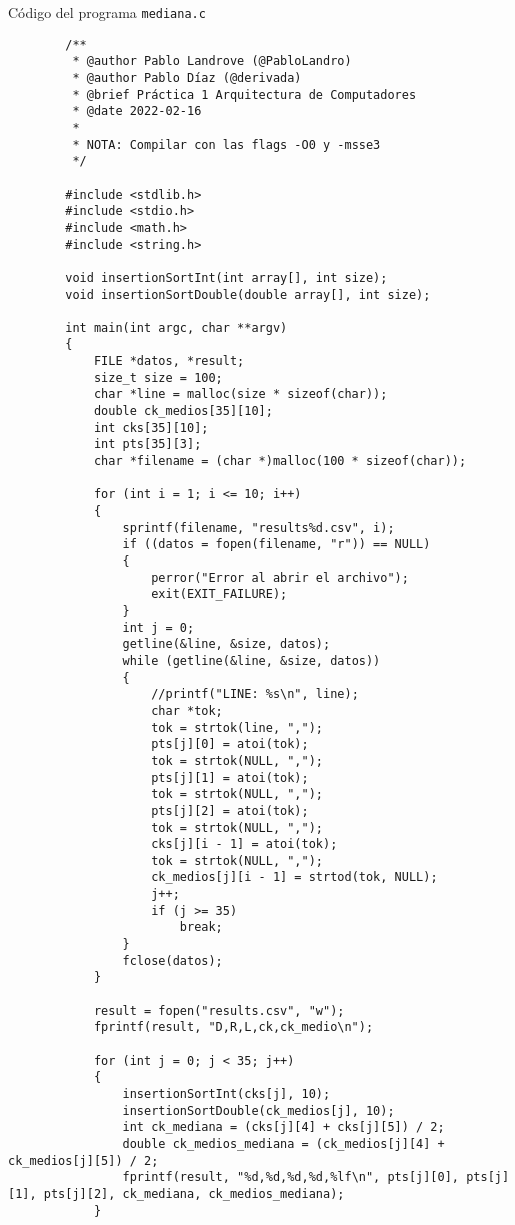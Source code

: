 \documentclass[a4paper,twocolumn]{article}
\begin{document}
        \newpage
        \large{Código del programa \texttt{mediana.c}}
        \begin{lstlisting}
        /**
         * @author Pablo Landrove (@PabloLandro)
         * @author Pablo Díaz (@derivada)
         * @brief Práctica 1 Arquitectura de Computadores
         * @date 2022-02-16
         *
         * NOTA: Compilar con las flags -O0 y -msse3
         */
        
        #include <stdlib.h>
        #include <stdio.h>
        #include <math.h>
        #include <string.h>
        
        void insertionSortInt(int array[], int size);
        void insertionSortDouble(double array[], int size);
        
        int main(int argc, char **argv)
        {
            FILE *datos, *result;
            size_t size = 100;
            char *line = malloc(size * sizeof(char));
            double ck_medios[35][10];
            int cks[35][10];
            int pts[35][3];
            char *filename = (char *)malloc(100 * sizeof(char));
        
            for (int i = 1; i <= 10; i++)
            {
                sprintf(filename, "results%d.csv", i);
                if ((datos = fopen(filename, "r")) == NULL)
                {
                    perror("Error al abrir el archivo");
                    exit(EXIT_FAILURE);
                }
                int j = 0;
                getline(&line, &size, datos);
                while (getline(&line, &size, datos))
                {
                    //printf("LINE: %s\n", line);
                    char *tok;
                    tok = strtok(line, ",");
                    pts[j][0] = atoi(tok);
                    tok = strtok(NULL, ",");
                    pts[j][1] = atoi(tok);
                    tok = strtok(NULL, ",");
                    pts[j][2] = atoi(tok);
                    tok = strtok(NULL, ",");
                    cks[j][i - 1] = atoi(tok);
                    tok = strtok(NULL, ",");
                    ck_medios[j][i - 1] = strtod(tok, NULL);
                    j++;
                    if (j >= 35)
                        break;
                }
                fclose(datos);
            }
        
            result = fopen("results.csv", "w");
            fprintf(result, "D,R,L,ck,ck_medio\n");
        
            for (int j = 0; j < 35; j++)
            {
                insertionSortInt(cks[j], 10);
                insertionSortDouble(ck_medios[j], 10);
                int ck_mediana = (cks[j][4] + cks[j][5]) / 2;
                double ck_medios_mediana = (ck_medios[j][4] + ck_medios[j][5]) / 2;
                fprintf(result, "%d,%d,%d,%d,%lf\n", pts[j][0], pts[j][1], pts[j][2], ck_mediana, ck_medios_mediana);
            }
        

\end{lstlisting}
\end{document}
